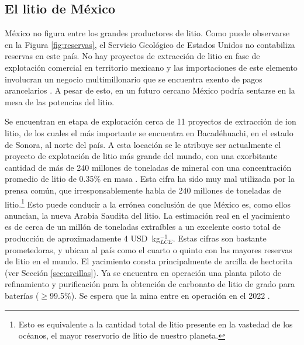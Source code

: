 \subsection{El litio de México}
México no figura entre los grandes productores de litio. Como puede observarse en la Figura \ref{fig:reservas}, el Servicio Geológico de Estados Unidos no contabiliza reservas en este país. %
No hay proyectos de extracción de litio en fase de explotación comercial en territorio mexicano y las importaciones de este elemento involucran un negocio multimillonario que se encuentra exento de pagos arancelarios \citep{SecEc2018}. A pesar de esto, en un futuro cercano México podría sentarse en la mesa de las potencias del litio.

Se encuentran en etapa de exploración cerca de 11 proyectos de extracción de ion litio, de los cuales el más importante se encuentra en Bacadéhuachi, en el estado de Sonora, al norte del país. A esta locación se le atribuye ser actualmente el proyecto de explotación de litio más grande del mundo, con una exorbitante cantidad de más de 240 millones de toneladas de mineral con una concentración promedio de litio de 0.35\% en masa \citep{Bacanora2018}. Esta cifra ha sido muy mal utilizada por la prensa común, que irresponsablemente habla de {240 millones de toneladas de litio}.\footnote{Esto es equivalente a la cantidad total de litio presente en la vastedad de los océanos, el mayor reservorio de litio de nuestro planeta.} Esto puede conducir a la errónea conclusión de que México es, como ellos anuncian, la nueva Arabia Saudita del litio. La estimación real en el yacimiento es de cerca de un millón de toneladas extraíbles a un excelente costo total de producción de aproximadamente 4 \ac{USD}~kg$_{LCE}^{-1}$. Estas cifras son bastante prometedoras, y ubican al país como el cuarto o quinto con las mayores reservas de litio en el mundo. El yacimiento consta principalmente de arcilla de hectorita (ver Sección \ref{sec:arcillas}). Ya se encuentra en operación una planta piloto de refinamiento y purificación para la obtención de carbonato de litio de grado para baterías ($\geqslant$99.5\%). Se espera que la mina entre en operación en el 2022 \citep{Bacanora2018}.

